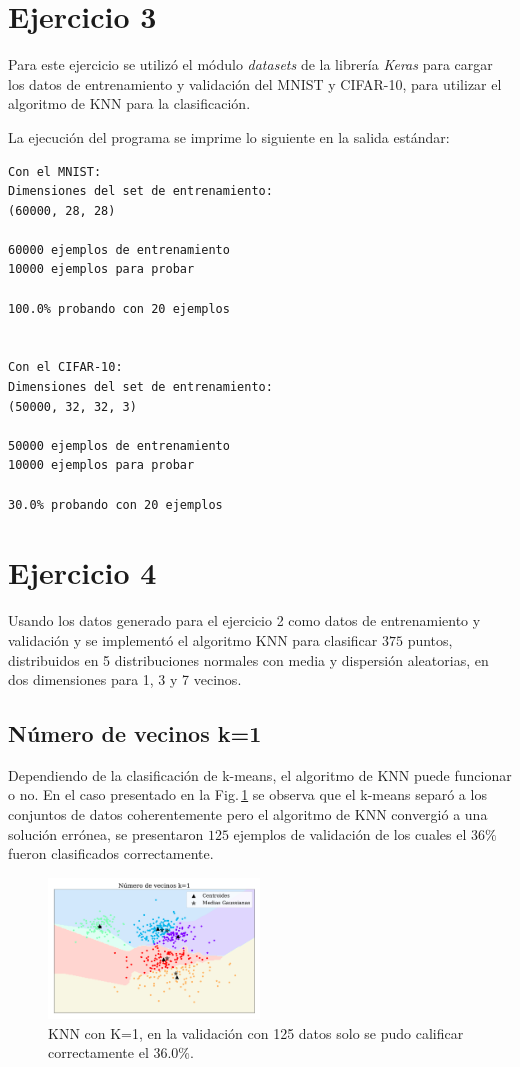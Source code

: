   \section*{Ejercicio 3}

   Para este ejercicio se utilizó el módulo \emph{datasets} de la librería \emph{Keras} para cargar los datos de entrenamiento y validación del MNIST y CIFAR-10, para utilizar el algoritmo de KNN para la clasificación.

   La ejecución del programa se imprime lo siguiente  en la salida estándar:

   \begin{verbatim}
Con el MNIST: 
Dimensiones del set de entrenamiento:  
(60000, 28, 28)

60000 ejemplos de entrenamiento
10000 ejemplos para probar

100.0% probando con 20 ejemplos


Con el CIFAR-10: 
Dimensiones del set de entrenamiento:
(50000, 32, 32, 3)

50000 ejemplos de entrenamiento
10000 ejemplos para probar

30.0% probando con 20 ejemplos
   \end{verbatim}


    \section*{Ejercicio 4}

    Usando los datos generado para el ejercicio  2 como datos de entrenamiento  y  validación y se implementó el algoritmo KNN para clasificar $375$ puntos,   distribuidos en  5 distribuciones normales  con media y dispersión aleatorias, en dos dimensiones para 1, 3 y 7 vecinos. 

    \subsection*{Número de vecinos k=1}

    Dependiendo de la clasificación de k-means, el algoritmo de KNN puede funcionar o no. En el caso presentado en la Fig.\,\ref{fig:ejer4_k_1_malo} se observa que el k-means separó a los conjuntos de datos coherentemente pero el algoritmo de KNN convergió a  una solución errónea, se presentaron $125$ ejemplos de validación de los cuales el $36\%$ fueron clasificados correctamente.

    \begin{figure}[H]
    \centering
    \includegraphics[width=0.5\textwidth]{plots/ejer_4_K-1_no_coverge.pdf}
    \caption{KNN  con K=1, en la validación con 125 datos solo se pudo calificar correctamente el 36.0\%.}
    \label{fig:ejer4_k_1_malo}
    \end{figure} 

